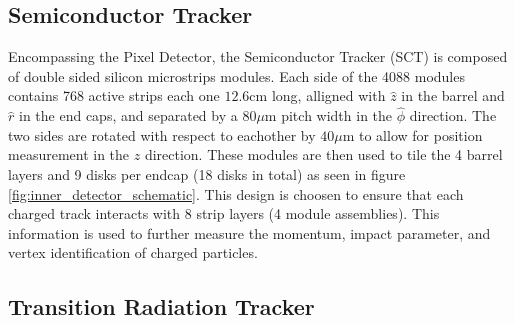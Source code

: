 \subsection{Semiconductor Tracker}

Encompassing the Pixel Detector, the Semiconductor Tracker (SCT) is composed of
double sided silicon microstrips modules.  Each side of the 4088 modules
contains 768 active strips each one $12.6$cm long, alligned with $\hat{z}$ in
the barrel and $\hat{r}$ in the end caps, and separated by a $80 \mu$m pitch
width in the $\hat{\phi}$ direction. The two sides are rotated with respect to
eachother by $40 \mu$m to allow for position measurement in the $z$ direction.
These modules are then used to tile the 4 barrel layers and 9 disks per endcap
(18 disks in total) as seen in figure \ref{fig:inner_detector_schematic}.  This
design is choosen to ensure that each charged track interacts with 8 strip
layers (4 module assemblies).  This information is used to further measure the
momentum, impact parameter, and vertex identification of charged particles.

\subsection{Transition Radiation Tracker}





